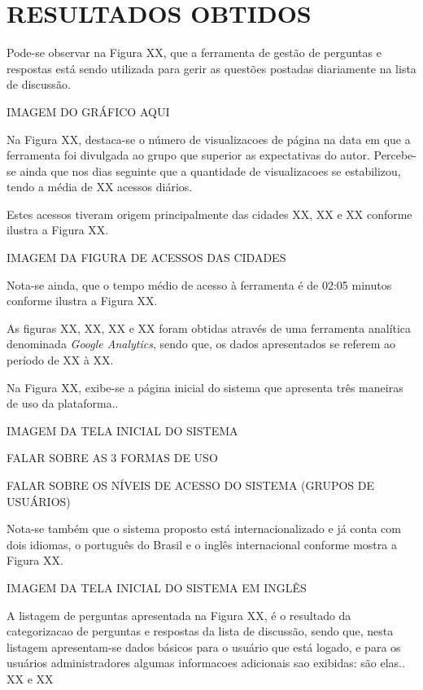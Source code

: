 \chapter{RESULTADOS OBTIDOS}
\label{chp:resultadosObtidos}
 
Pode-se observar na Figura XX, que a ferramenta de gestão de perguntas e
respostas está sendo utilizada para gerir as questões postadas diariamente na
lista de discussão.

IMAGEM DO GRÁFICO AQUI

Na Figura XX, destaca-se o número de visualizacoes de página na data em que a
ferramenta foi divulgada ao grupo que superior as expectativas do autor.
Percebe-se ainda que nos dias seguinte que a quantidade de visualizacoes se
estabilizou, tendo a média de XX acessos diários.

Estes acessos tiveram origem principalmente das cidades XX, XX e XX conforme
ilustra a Figura XX.

IMAGEM DA FIGURA DE ACESSOS DAS CIDADES

Nota-se ainda, que o tempo médio de acesso à ferramenta é de 02:05 minutos
conforme ilustra a Figura XX.

As figuras XX, XX, XX e XX foram obtidas através de uma ferramenta analítica
denominada \textit{Google Analytics}, sendo que, os dados apresentados se
referem ao período de XX à XX.





Na Figura XX, exibe-se a página inicial do sistema que apresenta três maneiras
de uso da plataforma.. 

IMAGEM DA TELA INICIAL DO SISTEMA

FALAR SOBRE AS 3 FORMAS DE USO

FALAR SOBRE OS NÍVEIS DE ACESSO DO SISTEMA (GRUPOS DE USUÁRIOS)

Nota-se também que o sistema proposto está internacionalizado e já conta com
dois idiomas, o português do Brasil e o inglês internacional conforme mostra a
Figura XX.

IMAGEM DA TELA INICIAL DO SISTEMA EM INGLÊS

A listagem de perguntas apresentada na Figura XX, é o resultado da categorizacao
de perguntas e respostas da lista de discussão, sendo que, nesta listagem
apresentam-se dados básicos para o usuário que está logado, e para os usuários
administradores algumas informacoes adicionais sao exibidas: são elas.. XX e XX

